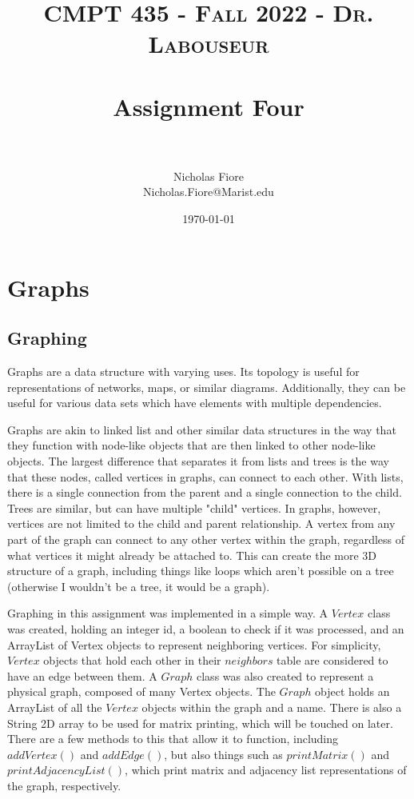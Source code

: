 \documentclass[letterpaper, 10pt,DIV=13]{scrartcl}
\title{	
   \normalfont \normalsize 
   \textsc{CMPT 435 - Fall 2022 - Dr. Labouseur} \\[10pt] %
   \horrule{0.5pt} \\[0.25cm] 	%
   \huge Assignment Four  \\     	    %
   \horrule{0.5pt} \\[0.25cm] 	%
}
\author{Nicholas Fiore \\ \normalsize Nicholas.Fiore@Marist.edu}
\date{\normalsize\today} 	%
\numberwithin{equation}{section} %
\numberwithin{figure}{section} %
\numberwithin{table}{section} %
\begin{document}
\maketitle %

\section{Graphs}
\subsection{Graphing}
Graphs are a data structure with varying uses. Its topology is useful for representations of networks, maps, or similar diagrams. Additionally, they can be useful for various data sets which have elements with multiple dependencies.

Graphs are akin to linked list and other similar data structures in the way that they function with node-like objects that are then linked to other node-like objects. The largest difference that separates it from lists and trees is the way that these nodes, called vertices in graphs, can connect to each other. With lists, there is a single connection from the parent and a single connection to the child. Trees are similar, but can have multiple "child" vertices. In graphs, however, vertices are not limited to the child and parent relationship. A vertex from any part of the graph can connect to any other vertex within the graph, regardless of what vertices it might already be attached to. This can create the more 3D structure of a graph, including things like loops which aren't possible on a tree (otherwise I wouldn't be a tree, it would be a graph).

Graphing in this assignment was implemented in a simple way. A $Vertex$ class was created, holding an integer id, a boolean to check if it was processed, and an ArrayList of Vertex objects to represent neighboring vertices. For simplicity, $Vertex$ objects that hold each other in their $neighbors$ table are considered to have an edge between them. A $Graph$ class was also created to represent a physical graph, composed of many Vertex objects. The $Graph$ object holds an ArrayList of all the $Vertex$ objects within the graph and a name. There is also a String 2D array to be used for matrix printing, which will be touched on later. There are a few methods to this that allow it to function, including $addVertex()$ and $addEdge()$, but also things such as $printMatrix()$ and $printAdjacencyList()$, which print matrix and adjacency list representations of the graph, respectively.
\end{document}
